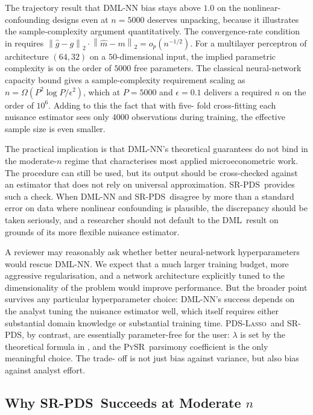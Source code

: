 \documentclass[11pt, a4paper]{article}
\theoremstyle{plain}
\theoremstyle{definition}
\theoremstyle{remark}
\newcommand{\lasso}{\textsc{Lasso}}
\newcommand{\pds}{\textsc{PDS}}
\newcommand{\dml}{\textsc{DML}}
\newcommand{\pysr}{\textsc{PySR}}
\newcommand{\epds}{\textsc{SR-PDS}}
\newcommand{\norm}[1]{\left\lVert #1 \right\rVert}
\begin{document}
The trajectory result that \dml-NN bias stays above $1.0$ on the
nonlinear-confounding designs even at $n=5000$ deserves
unpacking, because it illustrates the sample-complexity argument
quantitatively. The convergence-rate condition in
\citet{chernozhukov2018} requires $\norm{\hat g - g}_2 \cdot
\norm{\hat m - m}_2 = o_p(n^{-1/2})$. For a multilayer
perceptron of architecture $(64, 32)$ on a $50$-dimensional
input, the implied parametric complexity is on the order of
$5000$ free parameters. The classical neural-network capacity
bound \citep{anthony2009neural} gives a sample-complexity
requirement scaling as $n = \Omega(P^2 \log P / \epsilon^2)$,
which at $P = 5000$ and $\epsilon = 0.1$ delivers a required $n$
on the order of $10^6$. Adding to this the fact that with five-%
fold cross-fitting each nuisance estimator sees only $4000$
observations during training, the effective sample size is even
smaller.

The practical implication is that \dml-NN's theoretical
guarantees do not bind in the moderate-$n$ regime that
characterises most applied microeconometric work. The procedure
can still be used, but its output should be cross-checked
against an estimator that does not rely on universal
approximation. \epds\ provides such a check. When \dml-NN and
\epds\ disagree by more than a standard error on data where
nonlinear confounding is plausible, the discrepancy should be
taken seriously, and a researcher should not default to the
\dml\ result on grounds of its more flexible nuisance estimator.

A reviewer may reasonably ask whether better neural-network
hyperparameters would rescue \dml-NN. We expect that a much
larger training budget, more aggressive regularisation, and a
network architecture explicitly tuned to the dimensionality of
the problem would improve performance. But the broader point
survives any particular hyperparameter choice: \dml-NN's success
depends on the analyst tuning the nuisance estimator well, which
itself requires either substantial domain knowledge or
substantial training time. \pds-\lasso\ and \epds, by contrast,
are essentially parameter-free for the user: $\lambda$ is set by
the theoretical formula in \citet{bch2014}, and the \pysr\
parsimony coefficient is the only meaningful choice. The trade-%
off is not just bias against variance, but also bias against
analyst effort.

\subsection{Why \epds\ Succeeds at Moderate $n$}
\end{document}
